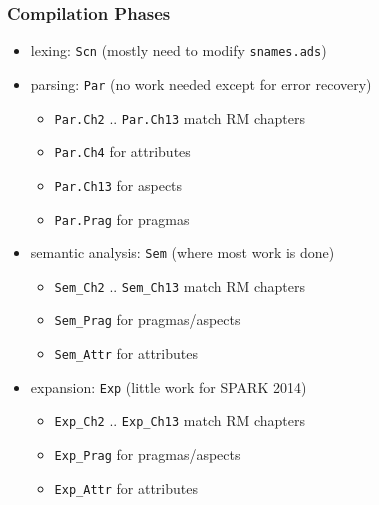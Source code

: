 \documentclass{beamer}
\newenvironment{specialframe}{%
  \begin{frame}[fragile,environment=specialframe]}{\end{frame}}
\begin{document}
\begin{specialframe}
  \frametitle{Compilation Phases}

\begin{itemize}
\item lexing: \verb|Scn| (mostly need to modify \verb|snames.ads|)
\item parsing: \verb|Par| (no work needed except for error recovery)
  \begin{itemize}
  \item \verb|Par.Ch2| .. \verb|Par.Ch13| match RM chapters
  \item \verb|Par.Ch4| for attributes
  \item \verb|Par.Ch13| for aspects
  \item \verb|Par.Prag| for pragmas
  \end{itemize}
\item semantic analysis: \verb|Sem| (where most work is done)
  \begin{itemize}
  \item \verb|Sem_Ch2| .. \verb|Sem_Ch13| match RM chapters
  \item \verb|Sem_Prag| for pragmas/aspects
  \item \verb|Sem_Attr| for attributes
  \end{itemize}
\item expansion: \verb|Exp| (little work for SPARK 2014)
  \begin{itemize}
  \item \verb|Exp_Ch2| .. \verb|Exp_Ch13| match RM chapters
  \item \verb|Exp_Prag| for pragmas/aspects
  \item \verb|Exp_Attr| for attributes
  \end{itemize}
\end{itemize}

\end{specialframe}
\end{document}
